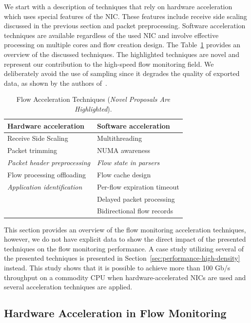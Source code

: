 We start with a description of techniques that rely on hardware acceleration which uses special features of the NIC. These features include receive side scaling discussed in the previous section and packet preprocessing. Software acceleration techniques are available regardless of the used NIC and involve effective processing on multiple cores and flow creation design. The Table~\ref{tab:flow-acc-techniques} provides an overview of the discussed techniques. The highlighted techniques are novel and represent our contribution to the high-speed flow monitoring field. We deliberately avoid the use of sampling since it degrades the quality of exported data, as shown by the authors of~\cite{Brauckhoff-2006-Impact}.

\begin{table}[ht!]
    \centering
    \begin{tabular}{l|l}
    \toprule
    \textbf{Hardware acceleration} & \textbf{Software acceleration} \\ \hline
    Receive Side Scaling & Multithreading \\
    Packet trimming & NUMA awareness \\
    \emph{Packet header preprocessing} & \emph{Flow state in parsers} \\
    Flow processing offloading & Flow cache design \\
    \emph{Application identification} & Per-flow expiration timeout \\ 
    & Delayed packet processing \\ 
    & Bidirectional flow records \\ \bottomrule
    \end{tabular}
    \caption{Flow Acceleration Techniques (\emph{Novel Proposals Are Highlighted}).}
    \label{tab:flow-acc-techniques}
\end{table}

This section provides an overview of the flow monitoring acceleration techniques, however, we do not have explicit data to show the direct impact of the presented techniques on the flow monitoring performance. A case study utilizing several of the presented techniques is presented in Section~\ref{sec:performance-high-density} instead. This study shows that it is possible to achieve more than 100 Gb/s throughput on a commodity CPU when hardware-accelerated NICs are used and several acceleration techniques are applied.


\subsection{Hardware Acceleration in Flow Monitoring}\label{sec:performance-hw-acceleration}

